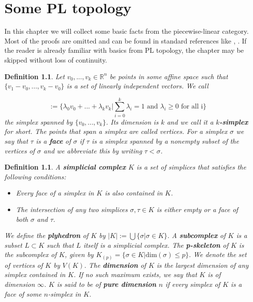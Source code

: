\documentclass{scrreprt}
\newtheorem{definition}[prop]{Definition}
\begin{document}
\tableofcontents

\chapter{Some PL topology}
\label{sec:Einleitung}

In this chapter we will collect some basic facts from the piecewise-linear category. Most of the proofs are omitted and can be found in standard references like \cite{pltopo}, \cite{hatcher}. If the reader is already familiar with basics from PL topology, the chapter may be skipped without loss of continuity.

\begin{definition}
Let $v_0,...,v_k \in \mathbb{R}^n$ be points in some affine space such that $\{ v_1-v_0,...,v_k-v_0 \}$ is a set of linearly independent vectors. We call

\begin{equation*}
[v_0,...,v_k] := \Biggl \{  \lambda_0v_0+...+ \lambda_kv_k \Bigg |  \sum_{i=0}^k \lambda_i =1 \text{ and } \lambda_i \geq 0 \text{ for all i} \Biggr \}
\end{equation*}
the simplex spanned by $\{v_0,...,v_k \}$. Its dimension is $k$ and we call it a \textbf{$k$-simplex} for short. The points that span a simplex are called vertices. For a simplex $\sigma$ we say that $\tau$ is a \textbf{face} of $\sigma$ if $\tau$ is a simplex spanned by a nonempty subset of the vertices of $\sigma$ and we abbreviate this by writing $\tau < \sigma$.
\end{definition}

\begin{definition}
A \textbf{simplicial complex} $K$ is a set of simplices that satisfies the following conditions:

\begin{itemize}
\item Every face of a simplex in $K$ is also contained in $K$.
\item The intersection of any two simplices $\sigma, \tau \in K$ is either empty or a face of both $\sigma$ and $\tau$.
\end{itemize}

We define the \textbf{plyhedron} of $K$ by $|K|:= \bigcup \{ \sigma | \sigma \in K \}$. A \textbf{subcomplex} of $K$ is a subset $L \subset K$ such that $L$ itself is a simplicial complex. The \textbf{p-skeleton} of $K$ is the subcomplex of $K$, given by $K_{(p)}= \{ \sigma \in  K | \text{dim}(\sigma) \leq p \}$. We denote the set of vertices of $K$ by $V(K)$. The \textbf{dimension} of $K$ is the largest dimension of any simplex contained in $K$. If no such maximum exists, we say that $K$ is of dimension $\infty$. $K$ is said to be of \textbf{pure dimension} $n$ if every simplex of $K$ is a face of some $n$-simplex in $K$.
\end{definition}
\end{document}
